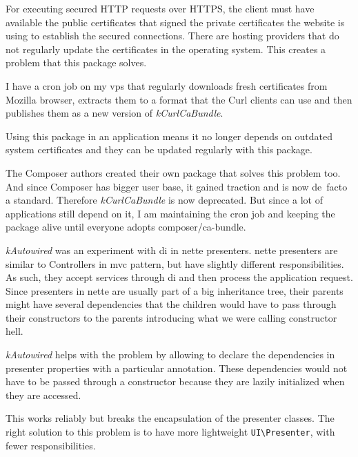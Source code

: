  \label{sec:state:curl-ca-bundle}

For executing secured HTTP requests over HTTPS, the client must have available the public certificates that signed the private certificates the website is using to establish the secured connections. There are hosting providers that do not regularly update the certificates in the operating system. This creates a problem that this package solves.

I have a cron job on my \gls{vps} that regularly downloads fresh certificates from Mozilla browser, extracts them to a format that the Curl clients can use and then publishes them as a new version of \textit{\gls{kCurlCaBundle}}.

Using this package in an application means it no longer depends on outdated system certificates and they can be updated regularly with this package.

The Composer authors created their own package  that solves this problem too. And since Composer has bigger user base, it gained traction and is now de~facto a standard. Therefore \textit{\gls{kCurlCaBundle}} is now deprecated. But since a lot of applications still depend on it, I am maintaining the cron job and keeping the package alive until everyone adopts composer/ca-bundle.

 \label{sec:state:autowired}

\textit{\gls{kAutowired}} was an experiment with \gls{di} in \gls{nette} presenters. \gls{nette} presenters are similar to Controllers in \gls{mvc} pattern, but have slightly different responsibilities. As such, they accept services through \gls{di} and then process the application request. Since presenters in \gls{nette} are usually part of a big inheritance tree, their parents might have several dependencies that the children would have to pass through their constructors to the parents introducing what we were calling constructor hell.

\textit{\gls{kAutowired}} helps with the problem by allowing to declare the dependencies in presenter properties with a particular annotation. These dependencies would not have to be passed through a constructor because they are lazily initialized when they are accessed.

This works reliably but breaks the encapsulation of the presenter classes. The right solution to this problem is to have more lightweight \lstinline{UI\Presenter}, with fewer responsibilities.

